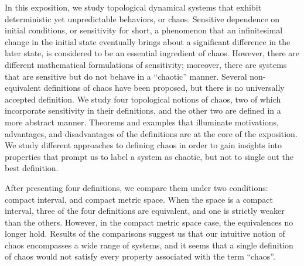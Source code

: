 \documentclass[10pt,twoside,draft]{book}
\begin{document}
In this exposition, we study topological dynamical systems that exhibit deterministic yet unpredictable behaviors, or chaos.
Sensitive dependence on initial conditions, or sensitivity for short, a phenomenon that an infinitesimal change in the initial state eventually brings about a significant difference in the later state, is considered to be an essential ingredient of chaos. 
However, there are different mathematical formulations of sensitivity; moreover, there are systems that are sensitive but do not behave in a ``chaotic'' manner.
Several non-equivalent definitions of chaos have been proposed, but there is no universally accepted definition.
We study four topological notions of chaos, two of which incorporate sensitivity in their definitions, and the other two are defined in a more abstract manner. %
Theorems and examples that illuminate motivations, advantages, and disadvantages of the definitions are at the core of the exposition.
We study different approaches to defining chaos in order to gain insights into properties that prompt us to label a system as chaotic, but not to single out the best definition.

After presenting four definitions, we compare them under two conditions: compact interval, and compact metric space.
When the space is a compact interval, three of the four definitions are equivalent, and one is strictly weaker than the others.
However, in the compact metric space case, the equivalences no longer hold.
Results of the comparisons suggest us that our intuitive notion of chaos encompasses a wide range of systems, and it seems that a single definition of chaos would not satisfy every property associated with the term ``chaos''.



\end{document}
